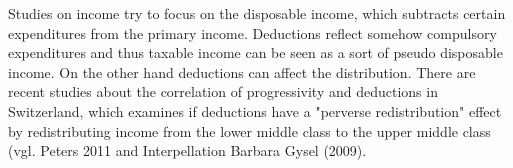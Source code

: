 \documentclass[twoside]{article}\usepackage[]{graphicx}\usepackage[]{color}
\begin{document}
\begin{multicols}{2}
Studies on income try to focus on the disposable income, which subtracts certain expenditures from the primary income. Deductions reflect somehow compulsory expenditures and thus taxable income can be seen as a sort of pseudo disposable income. On the other hand deductions can affect the distribution. There are recent studies about the correlation of progressivity and deductions in Switzerland, which examines if deductions have a "perverse redistribution" effect by redistributing income from the lower middle class to the upper middle class (vgl. Peters 2011 and Interpellation Barbara Gysel (2009).








\end{multicols}
\end{document}

